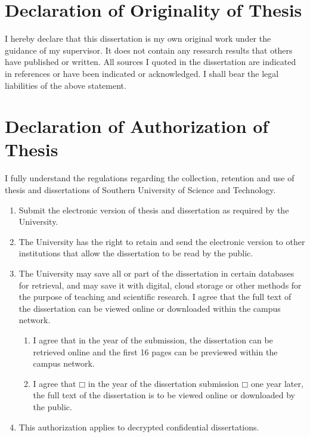 \begin{statementcopyright}
  \section*{Declaration of Originality of Thesis}
  \vspace{1em}

    I hereby declare that this dissertation is my own original work under the guidance of my supervisor. It does not contain any research results that others have published or written. All sources I quoted in the dissertation are indicated in references or have been indicated or acknowledged. I shall bear the legal liabilities of the above statement.

  \authorsign

  \section*{Declaration of Authorization of Thesis}

  \vspace{1em}

    I fully understand the regulations regarding the collection, retention and use of thesis and dissertations of Southern University of Science and Technology.
    \begin{enumerate}
      \item Submit the electronic version of thesis and dissertation as required by the University.
      \item The University has the right to retain and send the electronic version to other institutions that allow the dissertation to be read by the public.
      \item The University may save all or part of the dissertation in certain databases for retrieval, and may save it with digital, cloud storage or other methods for the purpose of teaching and scientific research. I agree that the full text of the dissertation can be viewed online or downloaded within the campus network.
      \begin{enumerate}[label={\arabic*)}]
        \item I agree that in the year of the submission, the dissertation can be retrieved online and the first 16 pages can be previewed within the campus network.
        \item I agree that $\mdlgwhtsquare$ in the year of the dissertation submission $\mdlgwhtsquare$ one year later, the full text of the dissertation is to be viewed online or downloaded by the public.
      \end{enumerate}
      \item This authorization applies to decrypted confidential dissertations.
    \end{enumerate}


  \authorsupervisorsign

\end{statementcopyright}